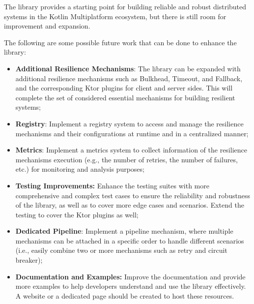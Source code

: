 The library provides a starting point for building reliable and robust distributed systems in the Kotlin Multiplatform ecosystem, but there is still room for improvement and expansion.

The following are some possible future work that can be done to enhance the library:

\begin{itemize}
    \item \textbf{Additional Resilience Mechanisms}: The library can be expanded with additional resilience mechanisms such as Bulkhead,
    Timeout, and Fallback, and the corresponding Ktor plugins for client and server sides.
    This will complete the set of considered essential mechanisms for building resilient systems;

    \item \textbf{Registry}:
    Implement a registry system
    to access and manage the resilience mechanisms and their configurations at runtime and in a centralized manner;

    \item \textbf{Metrics}:
    Implement a metrics system to collect information of the resilience mechanisms execution (e.g., the number of retries, the number of failures, etc.) for monitoring and analysis purposes;

    \item \textbf{Testing Improvements:}
    Enhance the testing suites with more comprehensive and complex test cases
    to ensure the reliability and robustness of the library, as well as to cover more edge cases and scenarios.
    Extend the testing to cover the Ktor plugins as well;

    \item \textbf{Dedicated Pipeline}:
    Implement a pipeline mechanism,
    where multiple mechanisms can be attached in a specific order to handle different scenarios (i.e., easily combine two or more mechanisms such as retry and circuit breaker);

    \item \textbf{Documentation and Examples:}
    Improve the documentation
    and provide more examples to help developers understand and use the library effectively.
    A website or a dedicated page should be created
    to host these resources.

\end{itemize}
